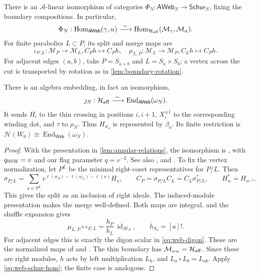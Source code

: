 \documentclass[a4paper,11pt]{amsart}
\numberwithin{equation}{subsection}
\theoremstyle{plain}
\theoremstyle{definition}
\theoremstyle{remark}
\newcommand{\Hom}{\operatorname{Hom}}
\begin{document}
\begin{lemma}\label{lem:vertex-normalization}
There is an $\mathcal A$-linear isomorphism of categories
$\Phi_N:\mathsf{AWeb}_N\to\mathsf{Schur}_N$, fixing the
boundary compositions. In particular,
\begin{gather}\label{eq:web-schur-hom}
\Phi_N:\Hom_{\mathsf{AWeb}}(\gamma,\alpha)
\xrightarrow{\ \sim\ }
\Hom_{\mathcal H_{\rm aff}}(\mathcal M_\gamma,\mathcal M_\alpha).
\end{gather}
For finite parabolics $L\subset P$, its split and merge maps are
\[
\iota_{P,L}:\mathcal M_P\longrightarrow\mathcal M_L,
C_Ph\longmapsto C_Ph,\quad
\mu_{L,P}:\mathcal M_L\longrightarrow\mathcal M_P,
C_Lh\longmapsto C_Ph.
\]
For adjacent edges $(a,b)$, take $P=S_{a+b}$ and
$L=S_a\times S_b$; a vertex across the cut is transported
by rotation as in \autoref{lem:boundary-rotation}.

There is an algebra embedding, in fact an isomorphism,
\begin{gather*}
\jmath_N:\mathcal H_{\rm aff}
\xrightarrow{\ \sim\ }\operatorname{End}_{\mathsf{AWeb}}(\omega_N).
\end{gather*}
It sends $H_i$ to the thin crossing in positions $i,i+1$,
$X_i^{\pm1}$ to the corresponding winding dot, and $\tau$ to
$\rho_N$. Thus $H_{w_a}$ is represented by $\beta_a$.
Its finite restriction is
$\mathcal H(W_0)\cong\operatorname{End}_{\mathsf{Web}}(\omega_N)$.
\end{lemma}

\begin{proof}
With the presentation in \autoref{lem:annular-relations}, the isomorphism is
\cite[Theorem~4.16, Proposition~4.18(1)]{SSW}, with $q_{\rm SSW}=v$
and our flag parameter $q=v^{-2}$. See also \cite{GreenAffine}, \cite[Theorem~3.22]{TVW}
and \cite{Brundan}. To fix the vertex normalization, let
$P^L$ be the minimal right-coset representatives for $P/L$.
Then
\[
\sigma_{P/L}=\sum_{x\in P^L}
v^{\ell(w_P)-\ell(w_L)-\ell(x)}H_x,\qquad
C_P=\sigma_{P/L}C_L=C_L\sigma_{P/L}^{*},
\qquad H_w^*=H_{w^{-1}}.
\]
This gives the split as an inclusion of right ideals.
The induced-module presentation makes the merge well-defined.
Both maps are integral, and the shuffle expansion gives
\[
\mu_{L,P}\circ\iota_{P,L}
=\frac{h_P}{h_L}\,\operatorname{id}_{\mathcal M_P},
\qquad h_{S_a}=[a]!.
\]
For adjacent edges this is exactly the digon scalar in
\autoref{eq:web-digon}. These are the normalized maps of
\cite{TVW,LatifiTubbenhauer} and \cite[(3.21)--(3.22)]{SSW}.
The thin boundary has $\mathcal M_{\omega_N}=\mathcal H_{\rm aff}$.
Since these are right modules, $h$ acts by left multiplication
$L_h$, and $L_a\circ L_b=L_{ab}$.
Apply \autoref{eq:web-schur-hom}; the finite case is analogous.
\end{proof}
\end{document}
